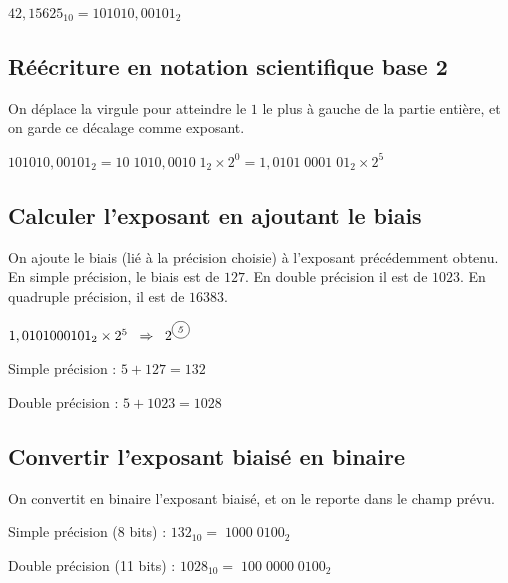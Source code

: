 \documentclass[11pt,a4paper]{article}
\begin{document}
$ 42,15625_{10} = 101010,00101_{2} $

\bigskip

\subsection{Réécriture en notation scientifique base 2}

\medskip

On déplace la virgule pour atteindre le $ 1 $ le plus à gauche de la partie entière, et on garde ce décalage comme exposant.

\medskip

$ 101010,00101_{2} = 10 \; 1010,0010 \; 1_{2} \times 2^{0} = 1,0101 \; 0001 \; 01_{2} \times 2^{5} $

\bigskip

\subsection{Calculer l'exposant en ajoutant le biais}

\medskip

On ajoute le biais (lié à la précision choisie) à l'exposant précédemment obtenu.
En simple précision, le biais est de $ 127 $. En double précision il est de $ 1023 $. En quadruple précision, il est de $ 16383 $.

\medskip

$ 1,0101000101_{2} \times 2^{5}  \; \; \Rightarrow \; \;  2^{\text{\circled{\textit{5}}}} $

\medskip

Simple précision : $ 5 + 127 = 132 $

\medskip

Double précision : $ 5 + 1023 = 1028 $

\bigskip

\subsection{Convertir l'exposant biaisé en binaire}

\medskip

On convertit en binaire l'exposant biaisé, et on le reporte dans le champ prévu.

\medskip

Simple précision (8 bits) : $ 132_{10} = \; 1000 \; 0100_{2} $

\medskip

Double précision (11 bits) : $ 1028_{10} = \; 100 \; 0000 \; 0100_{2} $
\end{document}

